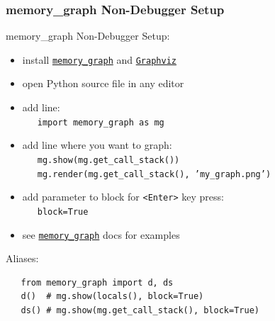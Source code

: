 \documentclass[10pt, colorlinks=true, urlcolor=blue]{beamer}
\begin{document}
\begin{frame}[fragile]\frametitle{memory\_graph Non-Debugger Setup}
  memory\_graph Non-Debugger Setup:
  \begin{itemize}
  \item install \href{https://pypi.org/project/memory-graph/}{\texttt{memory\_graph}} and \href{https://graphviz.org/download/}{\texttt{Graphviz}}
  \item open Python source file in any editor
  \item add line: \\ \ \ \ {\footnotesize \texttt{import memory_graph as mg}}
  \item add line where you want to graph: \\
    \ \ \ {\footnotesize \texttt{mg.show(mg.get_call_stack())}}\\
    \ \ \ {\footnotesize \texttt{mg.render(mg.get_call_stack(), 'my_graph.png')}}\\
  \item add parameter to block for \texttt{<Enter>} key press:\\
    \ \ \ {\footnotesize \texttt{block=True}}
  \item see \href{https://pypi.org/project/memory-graph/}{\texttt{memory\_graph}} docs for examples
  \end{itemize}

  \vspace{2em}
  
  Aliases:
 \begin{verbatim}
   from memory_graph import d, ds
   d()  # mg.show(locals(), block=True)
   ds() # mg.show(mg.get_call_stack(), block=True)
 \end{verbatim}
\end{frame}
\end{document}
